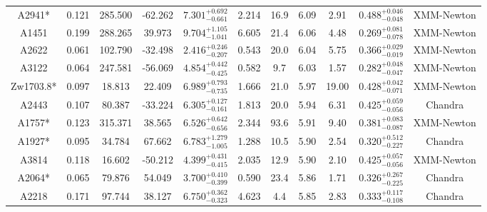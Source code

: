 \documentclass{aa}   %
\begin{document}
\begin{table}[h!]
\begin{center}
\begin{tabular}{ c  c  c  c c c c c c c c }
A2941*              		&		0.121	&	285.500	&	-62.262	& $	7.301^{+0.692}_{-0.661}$  &      2.214	&  16.9	&	6.09	&	2.91	&	$ 0.488^{+0.046}_{-0.048}  $ &	  XMM-Newton  \\
A1451               		&		0.199	&	288.265	&	39.973	& $	9.704^{+1.105}_{-1.041}$  &      6.605	&  21.4	&	6.06	&	4.48	&	$ 0.269^{+0.081}_{-0.078}  $ &	  XMM-Newton  \\
A2622               		&		0.061	&	102.790	&	-32.498	& $	2.416^{+0.246}_{-0.207}$  &      0.543	&  20.0	&	6.04	&	5.75	&	$ 0.366^{+0.029}_{-0.019}  $ &	 XMM-Newton   \\
A3122               		&		0.064	&	247.581	&	-56.069	& $	4.854^{+0.442}_{-0.425}$  &      0.582	&  9.7	&	6.03	&	1.57	&	$ 0.282^{+0.048}_{-0.047}  $ &	  XMM-Newton  \\
Zw1703.8*           		&		0.097	&	18.813	&	22.409	& $	6.989^{+0.793}_{-0.735}$  &      1.666	&  21.0	&	5.97	&	19.00	&	$ 0.428^{+0.042}_{-0.071}  $ &	 XMM-Newton   \\
A2443               		&		0.107	&	80.387	&	-33.224	& $	6.305^{+0.127}_{-0.161}$  &      1.813	&  20.0	&	5.94	&	6.31	&	$ 0.425^{+0.059}_{-0.056}  $ &	 Chandra      \\
A1757*              		&		0.123	&	315.371	&	38.565	& $	6.526^{+0.642}_{-0.656}$  &      2.344	&  93.6	&	5.91	&	9.40	&	$ 0.381^{+0.083}_{-0.087}  $ &	 XMM-Newton   \\
A1927*              		&		0.095	&	34.784	&	67.662	& $	6.783^{+1.279}_{-1.005}$  &      1.288	&  10.5	&	5.90	&	2.54	&	$ 0.320^{+0.512}_{-0.227}  $ &	  Chandra     \\
A3814               		&		0.118	&	16.602	&	-50.212	& $	4.399^{+0.431}_{-0.415}$  &      2.035	&  12.9	&	5.90	&	2.10	&	$ 0.425^{+0.057}_{-0.056}  $ &	  XMM-Newton  \\
A2064*              		&		0.065	&	79.876	&	54.049	& $	3.700^{+0.410}_{-0.399}$  &      0.590	&  23.4	&	5.86	&	1.71	&	$ 0.326^{+0.267}_{-0.225}  $ &	  Chandra     \\
A2218               		&		0.171	&	97.744	&	38.127	& $	6.750^{+0.362}_{-0.323}$  &      4.623	&  4.4	&	5.85	&	2.83	&	$ 0.333^{+0.117}_{-0.108}  $ &	  Chandra     \\

 \hline 
 

\end{tabular}
\end{center}
\end{table}
\end{document}
